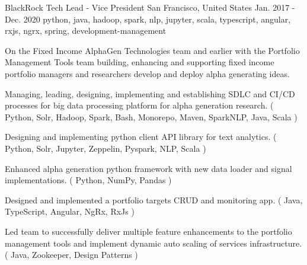 \cventry
    {BlackRock} %
    {Tech Lead - Vice President} %
    {San Francisco, United States} %
    {Jan. 2017 - Dec. 2020} %
    { python, java, hadoop, spark, nlp, jupyter, scala, typescript, angular, rxjs, ngrx, spring, development-management} %
    {
        On the Fixed Income AlphaGen Technologies team and earlier with the Portfolio Management Tools team building, enhancing and supporting fixed income portfolio managers and researchers develop and deploy alpha generating ideas.
    \begin{cvitems} %
        \item { Managing, leading, designing, implementing and establishing SDLC and CI/CD processes for big data processing platform for alpha generation research. ( Python, Solr, Hadoop, Spark, Bash, Monorepo, Maven, SparkNLP, Java, Scala ) }
        \item { Designing and implementing python client API library for text analytics. ( Python, Solr, Jupyter, Zeppelin, Pyspark, NLP, Scala )}
        \item { Enhanced alpha generation python framework with new data loader and signal implementations. ( Python, NumPy, Pandas )}
        \item { Designed and implemented a portfolio targets CRUD and monitoring app. ( Java, TypeScript, Angular, NgRx, RxJs ) }
        \item { Led team to successfully deliver multiple feature enhancements to the portfolio management tools and implement dynamic auto scaling of services infrastructure. ( Java, Zookeeper, Design Patterns )}
    \end{cvitems}
    }





